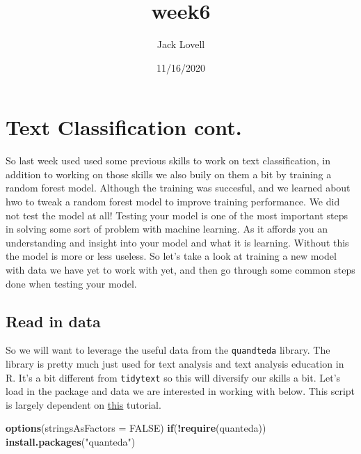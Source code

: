 \documentclass[
]{article}
\title{week6}
\author{Jack Lovell}
\date{11/16/2020}
\newenvironment{Shaded}{\begin{snugshade}}{\end{snugshade}}
\newcommand{\ControlFlowTok}[1]{\textcolor[rgb]{0.13,0.29,0.53}{\textbf{#1}}}
\newcommand{\DataTypeTok}[1]{\textcolor[rgb]{0.13,0.29,0.53}{#1}}
\newcommand{\KeywordTok}[1]{\textcolor[rgb]{0.13,0.29,0.53}{\textbf{#1}}}
\newcommand{\NormalTok}[1]{#1}
\newcommand{\OperatorTok}[1]{\textcolor[rgb]{0.81,0.36,0.00}{\textbf{#1}}}
\newcommand{\OtherTok}[1]{\textcolor[rgb]{0.56,0.35,0.01}{#1}}
\newcommand{\StringTok}[1]{\textcolor[rgb]{0.31,0.60,0.02}{#1}}
\begin{document}
\maketitle

\hypertarget{text-classification-cont.}{%
\section{Text Classification cont.}\label{text-classification-cont.}}

So last week used used some previous skills to work on text
classification, in addition to working on those skills we also buily on
them a bit by training a random forest model. Although the training was
succesful, and we learned about hwo to tweak a random forest model to
improve training performance. We did not test the model at all! Testing
your model is one of the most important steps in solving some sort of
problem with machine learning. As it affords you an understanding and
insight into your model and what it is learning. Without this the model
is more or less useless. So let's take a look at training a new model
with data we have yet to work with yet, and then go through some common
steps done when testing your model.

\hypertarget{read-in-data}{%
\subsection{Read in data}\label{read-in-data}}

So we will want to leverage the useful data from the \texttt{quandteda}
library. The library is pretty much just used for text analysis and text
analysis education in R. It's a bit different from \texttt{tidytext} so
this will diversify our skills a bit. Let's load in the package and data
we are interested in working with below. This script is largely
dependent on
\href{https://tm4ss.github.io/docs/Tutorial_7_Klassifikation.html}{this}
tutorial.

\begin{Shaded}
\begin{Highlighting}[]
\KeywordTok{options}\NormalTok{(}\DataTypeTok{stringsAsFactors =} \OtherTok{FALSE}\NormalTok{)}
\ControlFlowTok{if}\NormalTok{(}\OperatorTok{!}\KeywordTok{require}\NormalTok{(quanteda)) }\KeywordTok{install.packages}\NormalTok{(}\StringTok{"quanteda"}\NormalTok{)}
\end{Highlighting}
\end{Shaded}
\end{document}
